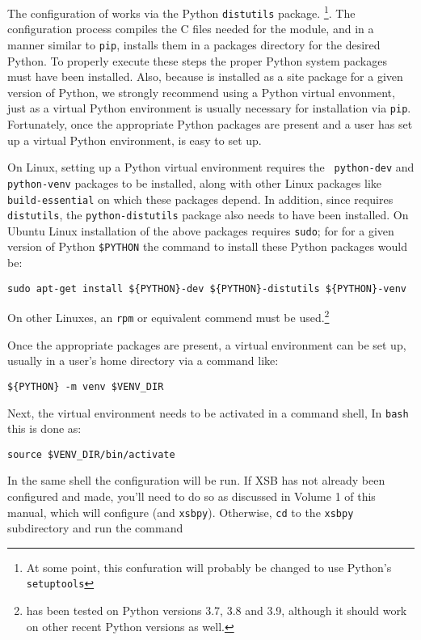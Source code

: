 The configuration of \px{} works via the Python {\tt distutils}
package. \footnote{At some point, this confuration will probably be
  changed to use Python's {\tt setuptools}}.  The configuration
process compiles the C files needed for the \px{} module, and in a
manner similar to {\tt pip}, installs them in a packages directory for
the desired Python.  To properly execute these steps the proper Python
system packages must have been installed.  Also, because \px{} is
installed as a site package for a given version of Python, we strongly
recommend using a Python virtual envonment, just as a virtual Python
environment is usually necessary for installation via {\tt pip}.
Fortunately, once the appropriate Python packages are present and a
user has set up a virtual Python environment, \px{} is easy to set
up.

On Linux, setting up a Python virtual environment requires the {\tt
  python-dev} and {\tt python-venv} packages to be installed, along
with other Linux packages like {\tt build-essential} on which these
packages depend.  In addition, since \px{} requires {\tt
  distutils}, the {\tt python-distutils} package also needs to have
been installed.  On Ubuntu Linux installation of the above packages
requires {\tt sudo}; for for a given version of Python {\tt \$PYTHON}
the command to install these Python packages would be:

{\tt sudo apt-get install \$\{PYTHON\}-dev \$\{PYTHON\}-distutils
\$\{PYTHON\}-venv}

\noindent
On other Linuxes, an {\tt rpm} or equivalent commend must be
used.\footnote{\px{} has been tested on Python versions 3.7, 3.8
  and 3.9, although it should work on other recent Python versions as
  well.}

Once the appropriate packages are present, a virtual environment can
be set up, usually in a user's home directory via a command like:

{\tt \$\{PYTHON\} -m venv {\tt \$VENV\_DIR}}

Next, the virtual environment needs to be activated in a command
shell,  In {\tt bash} this is done as:

{\tt source \$VENV\_DIR/bin/activate  }

In the same shell the \px{} configuration will be run.  If XSB has
not already been configured and made, you'll need to do so as
discussed in Volume 1 of this manual, which will configure \px{}
(and {\tt xsbpy}).  Otherwise, {\tt cd} to the {\tt xsbpy}
subdirectory and run the command

